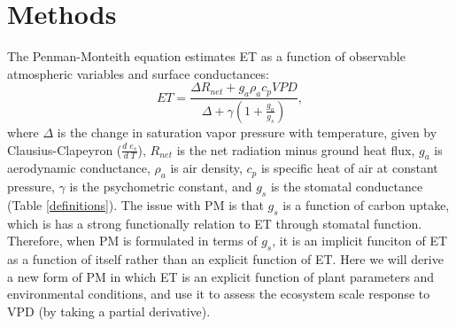 \section{Methods}
\label{methods}
The Penman-Monteith equation \citep [hereafter PM,][]{Penman_1948,
  Monteith_1965} estimates ET as a function of observable atmospheric
variables and surface conductances:
  \begin{equation}
    \label{orig_pen}
    ET = \frac{\Delta R_{net} + g_a \rho_a c_p VPD}{\Delta + \gamma(1 + \frac{g_a}{g_s})},
  \end{equation}
where $\Delta$ is the change in saturation vapor pressure with
temperature, given by Clausius-Clapeyron ($\frac{d \; e_s}{d \; T}$),
$R_{net}$ is the net radiation minus ground heat flux, $g_a$ is
aerodynamic conductance, $\rho_a$ is air density, $c_p$ is specific
heat of air at constant pressure, $\gamma$ is the psychometric
constant, and $g_s$ is the stomatal conductance (Table
\ref{definitions}). The issue with PM is that $g_s$ is a function of
carbon uptake, which is has a strong functionally relation to ET
through stomatal function. Therefore, when PM is formulated in terms
of $g_s$, it is an implicit funciton of ET as a function of itself
rather than an explicit function of ET. Here we will derive a new form
of PM in which ET is an explicit function of plant parameters and
environmental conditions, and use it to assess the ecosystem scale
response to VPD (by taking a partial derivative).

